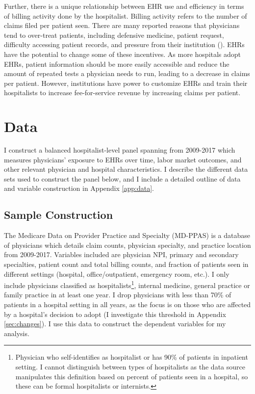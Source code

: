 \documentclass[12pt]{article}
\begin{document}
Further, there is a unique relationship between EHR use and efficiency in terms of billing activity done by the hospitalist. Billing activity refers to the number of claims filed per patient seen. There are many reported reasons that physicians tend to over-treat patients, including defensive medicine, patient request, difficulty accessing patient records, and pressure from their institution (\cite{lyu2017overtreatment}). EHRs have the potential to change some of these incentives. As more hospitals adopt EHRs, patient information should be more easily accessible and reduce the amount of repeated tests a physician needs to run, leading to a decrease in claims per patient. However, institutions have power to customize EHRs and train their hospitalists to increase fee-for-service revenue by increasing claims per patient. 





\section{Data}\label{sec:data}

I construct a balanced hospitalist-level panel spanning from 2009-2017 which measures physicians' exposure to EHRs over time, labor market outcomes, and other relevant physician and hospital characteristics. I describe the different data sets used to construct the panel below, and I include a detailed outline of data and variable construction in Appendix \ref{app:data}.

\subsection{Sample Construction}

The Medicare Data on Provider Practice and Specialty (MD-PPAS) is a database of physicians which details claim counts, physician specialty, and practice location from 2009-2017. Variables included are physician NPI, primary and secondary specialties, patient count and total billing counts, and fraction of patients seen in different settings (hospital, office/outpatient, emergency room, etc.). I only include physicians classified as hospitalists\footnote{Physician who self-identifies as hospitalist or has 90\% of patients in inpatient setting. I cannot distinguish between types of hospitalists as the data source manipulates this definition based on percent of patients seen in a hospital, so these can be formal hospitalists or internists.}, internal medicine, general practice or family practice in at least one year. I drop physicians with less than 70\% of patients in a hospital setting in all years, as the focus is on those who are affected by a hospital's decision to adopt (I investigate this threshold in Appendix \ref{sec:changes}). I use this data to construct the dependent variables for my analysis.  
\end{document}

